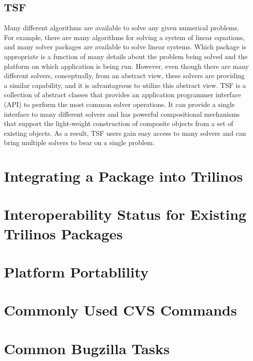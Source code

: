 \documentclass[12pt,relax]{TrilinosDevGuide}
\begin{document}
\subsection{TSF}
\label{subsect:InteropTSF}
Many different algorithms are available to solve any given numerical
problems.  For example, there are many algorithms for solving a system
of linear equations, and many solver packages are available to solve
linear systems.  Which package is appropriate is a function of
many details about the problem being solved and the platform on which
application is being run. However, even though
there are many different solvers, conceptually, from an abstract view,
these solvers are providing a similar capability, and it is
advantageous to utilize this abstract view.
TSF is a collection of abstract classes that provides an application
programmer interface (API) to perform the most common solver
operations.  It can provide a single interface to many different
solvers and has powerful compositional mechanisms that support the
light-weight construction of composite objects from a set of
existing objects.  As a result, TSF users gain easy access to many
solvers and can bring multiple solvers to bear on a single problem.

\section{Integrating a Package into Trilinos}
\label{Section:IntegratingPackages}
	
\section{Interoperability Status for Existing Trilinos Packages}

\section{Platform Portablility}

\clearpage



\appendix
\section{Commonly Used CVS Commands}
\label{Section:CVS}
\section{Common Bugzilla Tasks}
\label{Section:Bugzilla}
\end{document}
